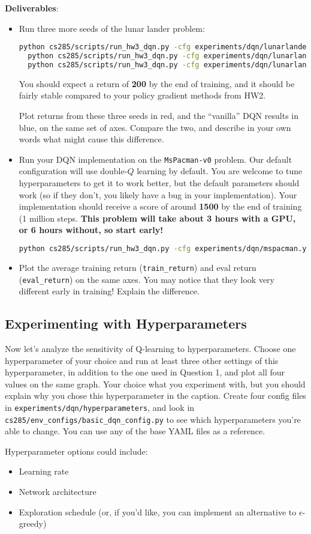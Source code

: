 \textbf{Deliverables}:
\begin{itemize}
    \item Run three more seeds of the lunar lander problem:
\begin{lstlisting}[language=bash,breaklines=true]
  python cs285/scripts/run_hw3_dqn.py -cfg experiments/dqn/lunarlander_doubleq.yaml --seed 1
  python cs285/scripts/run_hw3_dqn.py -cfg experiments/dqn/lunarlander_doubleq.yaml --seed 2
  python cs285/scripts/run_hw3_dqn.py -cfg experiments/dqn/lunarlander_doubleq.yaml --seed 3
\end{lstlisting}
    You should expect a return of \textbf{200} by the end of training, and it should be fairly stable compared to your policy gradient methods from HW2.
    
    Plot returns from these three seeds in red, and the ``vanilla'' DQN results in blue, on the same set of axes. Compare the two, and describe in your own words what might cause this difference.

    \item Run your DQN implementation on the \verb|MsPacman-v0| problem. Our default configuration will use double-$Q$ learning by default. You are welcome to tune hyperparameters to get it to work better, but the default parameters should work (so if they don't, you likely have a bug in your implementation). Your implementation should receive a score of around \textbf{1500} by the end of training (1 million steps. \textbf{This problem will take about 3 hours with a GPU, or {\color{red} 6 hours} without, so start early!}
    \begin{lstlisting}[language=bash,breaklines=true]
    python cs285/scripts/run_hw3_dqn.py -cfg experiments/dqn/mspacman.yaml
    \end{lstlisting}
    \item Plot the average training return (\verb|train_return|) and eval return (\verb|eval_return|) on the same axes. You may notice that they look very different early in training! Explain the difference.
\end{itemize}

\subsection{Experimenting with Hyperparameters} Now let's analyze the sensitivity of Q-learning to hyperparameters. Choose one hyperparameter of your choice and run at least three other settings of this hyperparameter, in addition to the one used in Question 1, and plot all four values on the same graph. Your choice what you experiment with, but you should explain why you chose this hyperparameter in the caption. Create four config files in \verb|experiments/dqn/hyperparameters|, and look in \verb|cs285/env_configs/basic_dqn_config.py| to see which hyperparameters you're able to change. You can use any of the base YAML files as a reference.

Hyperparameter options could include:
\begin{itemize}
    \item Learning rate
    \item Network architecture
    \item Exploration schedule (or, if you'd like, you can implement an alternative to $\epsilon$-greedy)
\end{itemize}